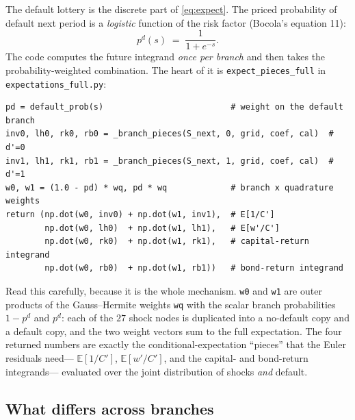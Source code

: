 \documentclass[11pt]{article}
\newcommand{\E}{\mathbb{E}}
\newcommand{\code}[1]{\texttt{#1}}
\begin{document}
The default lottery is the discrete part of \eqref{eq:expect}. The priced
probability of default next period is a \emph{logistic} function of the risk
factor (Bocola's equation 11):
\begin{equation}
p^d(s)\;=\;\frac{1}{1+e^{-s}} .
\label{eq:pd}
\end{equation}
The code computes the future integrand \emph{once per branch} and then takes
the probability-weighted combination. The heart of it is
\code{expect\_pieces\_full} in \code{expectations\_full.py}:
\begin{verbatim}
pd = default_prob(s)                          # weight on the default branch
inv0, lh0, rk0, rb0 = _branch_pieces(S_next, 0, grid, coef, cal)  # d'=0
inv1, lh1, rk1, rb1 = _branch_pieces(S_next, 1, grid, coef, cal)  # d'=1
w0, w1 = (1.0 - pd) * wq, pd * wq             # branch x quadrature weights
return (np.dot(w0, inv0) + np.dot(w1, inv1),  # E[1/C']
        np.dot(w0, lh0)  + np.dot(w1, lh1),   # E[w'/C']
        np.dot(w0, rk0)  + np.dot(w1, rk1),   # capital-return integrand
        np.dot(w0, rb0)  + np.dot(w1, rb1))   # bond-return integrand
\end{verbatim}
Read this carefully, because it is the whole mechanism. \code{w0} and
\code{w1} are outer products of the Gauss--Hermite weights \code{wq} with the
scalar branch probabilities $1-p^d$ and $p^d$: each of the $27$ shock nodes
is duplicated into a no-default copy and a default copy, and the two weight
vectors sum to the full expectation. The four returned numbers are exactly
the conditional-expectation ``pieces'' that the Euler residuals need---
$\E[1/C']$, $\E[w'/C']$, and the capital- and bond-return integrands---
evaluated over the joint distribution of shocks \emph{and} default.

\subsection{What differs across branches}
\end{document}
